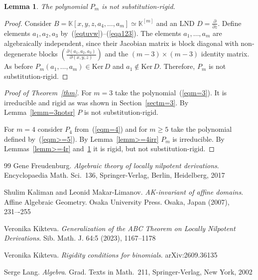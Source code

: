 \documentclass[12pt,reqno]{amsart}
\newcommand{\KK}{\mathbb K}
\newcommand{\Ker}{\mathrm{Ker}\,}
\theoremstyle{plain}
\newtheorem{lemma}{Lemma}
\theoremstyle{remark}
\theoremstyle{definition}
\begin{document}
\begin{lemma}
\label{lemm>=4nsr}
The polynomial $P_m$ is not substitution-rigid.
\end{lemma}
\begin{proof}
Consider $B=\KK[x,y,z,a_4,\dots,a_m]\simeq \KK^{[m]}$ and an LND $D=\frac{\partial}{\partial z}$. Define elements $a_1,a_2,a_3$ by~(\ref{eqtuvw})--(\ref{eqa123}). The elements $a_1,\dots,a_m$ are algebraically independent, since their Jacobian matrix is block diagonal with non-degenerate blocks $\left(\frac{\partial(a_1,a_2,a_3)}{\partial(x,y,z)}\right)$ and the ${(m-3)\times (m-3)}$ identity matrix. As before $P_m(a_1,\dots,a_m)\in\Ker D$ and $a_1\not\in\Ker D$. Therefore, $P_m$ is not substitution-rigid.
\end{proof}

\begin{proof}[Proof of Theorem~\ref{thm}]
    For $m=3$ take the polynomial~(\ref{eqm=3}). It is irreducible and rigid as was shown in Section~\ref{sectm=3}. By Lemma~\ref{lemm=3notsr} $P$ is not substitution-rigid.

    For $m=4$ consider $P_4$ from~(\ref{eqm=4}) and for $m\geq 5$ take the polynomial defined by~(\ref{eqm>=5}). By Lemma~\ref{lemm>=4irr} $P_m$ is irreducible. By Lemmas~\ref{lemm>=4r} and~\ref{lemm>=4nsr} it is rigid, but not substitution-rigid.
    
\end{proof}

\begin{thebibliography}{99}
Gene Freudenburg. \textit{Algebraic theory of locally nilpotent derivations}. Encyclopaedia Math. Sci.~136, Springer-Verlag, Berlin, Heidelberg, 2017

Shulim Kaliman and Leonid Makar-Limanov.
\textit{AK-invariant of affine domains}. Affine Algebraic Geometry. Osaka University Press. Osaka, Japan (2007), 231–-255

Veronika Kikteva. \textit{Generalization of the ABC Theorem on Locally Nilpotent Derivations}. Sib. Math. J. 64:5 (2023), 1167--1178

Veronika Kikteva. \textit{Rigidity conditions for binomials}. arXiv:2609.36135

Serge Lang. \textit{Algebra}. Grad. Texts in Math.~211, Springer-Verlag, New York, 2002

\end{thebibliography}
\end{document}
